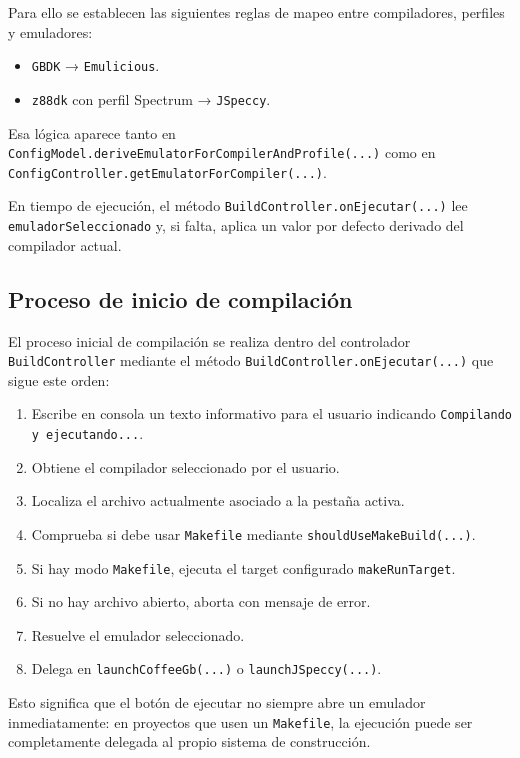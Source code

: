 \documentclass[../../main.tex]{subfiles}
\begin{document}
Para ello se establecen las siguientes reglas de mapeo entre compiladores, perfiles y emuladores:

\begin{itemize}
    \item \lstinline|GBDK| → \lstinline|Emulicious|.
    \item \lstinline|z88dk| con perfil Spectrum → \lstinline|JSpeccy|.
\end{itemize}

Esa lógica aparece tanto en \lstinline|ConfigModel.deriveEmulatorForCompilerAndProfile(...)| como en \lstinline|ConfigController.getEmulatorForCompiler(...)|.

En tiempo de ejecución, el método \lstinline|BuildController.onEjecutar(...)| lee \lstinline|emuladorSeleccionado| y, si falta, aplica un valor por defecto derivado del compilador actual.


\subsection{Proceso de inicio de compilación}

El proceso inicial de compilación se realiza dentro del controlador \lstinline|BuildController| mediante el método \lstinline|BuildController.onEjecutar(...)| que sigue este orden:

\begin{enumerate}
    \item Escribe en consola un texto informativo para el usuario indicando \lstinline|Compilando y ejecutando...|.
    \item Obtiene el compilador seleccionado por el usuario.
    \item Localiza el archivo actualmente asociado a la pestaña activa.
    \item Comprueba si debe usar \lstinline|Makefile| mediante \lstinline|shouldUseMakeBuild(...)|.
    \item Si hay modo \lstinline|Makefile|, ejecuta el target configurado \lstinline|makeRunTarget|.
    \item Si no hay archivo abierto, aborta con mensaje de error.
    \item Resuelve el emulador seleccionado.
    \item Delega en \lstinline|launchCoffeeGb(...)| o \lstinline|launchJSpeccy(...)|.
\end{enumerate}

Esto significa que el botón de ejecutar no siempre abre un emulador inmediatamente: en proyectos que usen un \lstinline|Makefile|, la ejecución puede ser completamente delegada al propio sistema de construcción.
\end{document}
